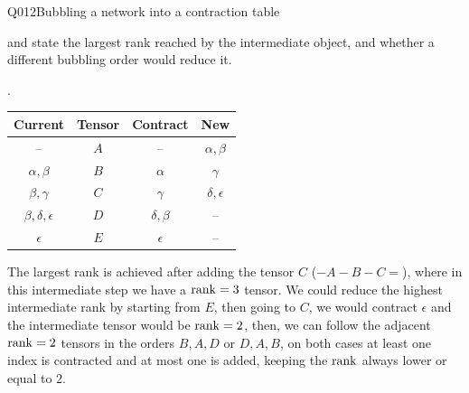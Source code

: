 \begin{entry}{Q012}{Bubbling a network into a contraction table}
\begin{problem}
and state the largest rank reached by the intermediate object, and whether a different
bubbling order would reduce it.

\end{problem}


\begin{solution}
.
\vspace{0.1cm}
\begin{center}
\begin{tabular}{|c|c|c|c|}
\hline
Current & Tensor & Contract & New \\
\hline
--                      & $A$ & --          & $\alpha,\beta$ \\
  $\alpha,\beta$        & $B$ & $\alpha$    & $\gamma$   \\
 $\beta,\gamma$         & $C$ &  $\gamma$   &  $\delta,\epsilon$ \\
$\beta,\delta,\epsilon$ & $D$ &   $\delta,\beta$  & -- \\
            $\epsilon$  & $E$ &   $\epsilon$      &  -- \\
\hline
\end{tabular}
\end{center}
\vspace{0.1cm}
The largest rank is achieved after adding the tensor $C$ ($-A-B-C=$), where in this intermediate step we have a $\operatorname{rank}=3$ tensor. We could reduce the highest intermediate rank by starting from $E$, then going to $C$, we would contract $\epsilon$ and the intermediate tensor would be $\operatorname{rank}=2$, then, we can follow the adjacent $\operatorname{rank}=2$ tensors in the orders $B,A,D$ or $D,A,B$, on both cases at least one index is contracted and at most one is added, keeping the $\operatorname{rank}$ always lower or equal to $2$.
\end{solution}




\end{entry}